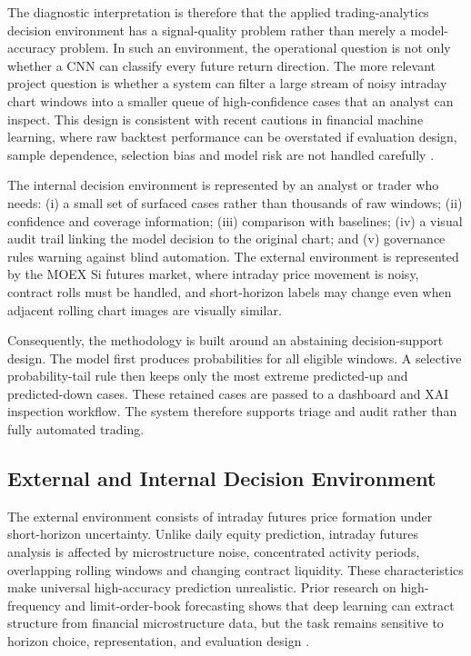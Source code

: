The diagnostic interpretation is therefore that the applied trading-analytics decision environment has a signal-quality problem rather than merely a model-accuracy problem. In such an environment, the operational question is not only whether a CNN can classify every future return direction. The more relevant project question is whether a system can filter a large stream of noisy intraday chart windows into a smaller queue of high-confidence cases that an analyst can inspect. This design is consistent with recent cautions in financial machine learning, where raw backtest performance can be overstated if evaluation design, sample dependence, selection bias and model risk are not handled carefully \cite{lopez_de_prado_afml,bailey_deflated_sharpe}.

The internal decision environment is represented by an analyst or trader who needs: (i) a small set of surfaced cases rather than thousands of raw windows; (ii) confidence and coverage information; (iii) comparison with baselines; (iv) a visual audit trail linking the model decision to the original chart; and (v) governance rules warning against blind automation. The external environment is represented by the MOEX Si futures market, where intraday price movement is noisy, contract rolls must be handled, and short-horizon labels may change even when adjacent rolling chart images are visually similar.

Consequently, the methodology is built around an abstaining decision-support design. The model first produces probabilities for all eligible windows. A selective probability-tail rule then keeps only the most extreme predicted-up and predicted-down cases. These retained cases are passed to a dashboard and XAI inspection workflow. The system therefore supports triage and audit rather than fully automated trading.

\subsection{External and Internal Decision Environment}
\label{subsec:environment}

The external environment consists of intraday futures price formation under short-horizon uncertainty. Unlike daily equity prediction, intraday futures analysis is affected by microstructure noise, concentrated activity periods, overlapping rolling windows and changing contract liquidity. These characteristics make universal high-accuracy prediction unrealistic. Prior research on high-frequency and limit-order-book forecasting shows that deep learning can extract structure from financial microstructure data, but the task remains sensitive to horizon choice, representation, and evaluation design \cite{deeplob,zhang_lob_cnn,sirignano_cont_universal,ohara_microstructure}.


